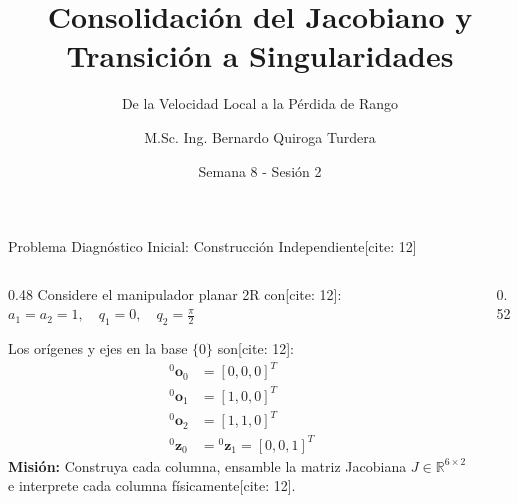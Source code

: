 \documentclass[aspectratio=169, xcolor={table,xcdraw}]{beamer}
\title[Consolidación y Singularidades]{Consolidación del Jacobiano y Transición a Singularidades}
\subtitle{De la Velocidad Local a la Pérdida de Rango}
\author[B. Quiroga Turdera]{M.Sc. Ing. Bernardo Quiroga Turdera}
\institute[UCB Tarija]{Universidad Católica Boliviana ``San Pablo'' — Sede Tarija}
\date{Semana 8 - Sesión 2}
\begin{document}
\begin{frame} 
    \titlepage
\end{frame}

\begin{frame}{Problema Diagnóstico Inicial: Construcción Independiente[cite: 12]}
    \begin{columns}[T]
        \begin{column}{0.48\textwidth}
            \small
            Considere el manipulador planar 2R con[cite: 12]:
            $a_1 = a_2 = 1, \quad q_1 = 0, \quad q_2 = \frac{\pi}{2}$
            
            \vspace{0.2cm}
            Los orígenes y ejes en la base $\{0\}$ son[cite: 12]:
            \begin{align*}
                {}^0\mathbf{o}_0 &= [0, 0, 0]^T \\
                {}^0\mathbf{o}_1 &= [1, 0, 0]^T \\
                {}^0\mathbf{o}_2 &= [1, 1, 0]^T \\
                {}^0\mathbf{z}_0 &= {}^0\mathbf{z}_1 = [0, 0, 1]^T
            \end{align*}
            \textbf{Misión:} Construya cada columna, ensamble la matriz Jacobiana $J \in \mathbb{R}^{6 \times 2}$ e interprete cada columna físicamente[cite: 12].
        \end{column}
        \begin{column}{0.52\textwidth}
            \centering
\end{column}
\end{columns}
\end{frame}
\end{document}
